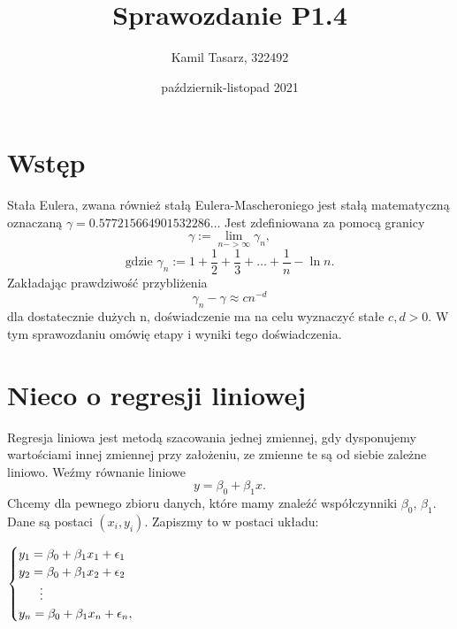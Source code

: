 \documentclass[a4paper,12pt]{article}
\title{Sprawozdanie P1.4}
\author{Kamil Tasarz, 322492}
\date{październik-listopad 2021}
\begin{document}
\maketitle


\section{Wstęp}

Stała Eulera, zwana również stałą Eulera-Mascheroniego jest stałą matematyczną oznaczaną $\gamma =  0.577215664901532286 \dots$ Jest zdefiniowana za pomocą granicy 
$$\gamma := \lim_{n-> \infty} \gamma_n,$$ $$\text{gdzie }\gamma_n := 1 + \frac{1}{2} + \frac{1}{3} + \dots + \frac{1}{n} - \ln{n}.$$
Zakładając prawdziwość przybliżenia $$\gamma_n - \gamma \approx cn^{-d}$$ dla dostatecznie dużych n, doświadczenie ma na celu wyznaczyć stałe $c, d >0$. W tym sprawozdaniu omówię etapy i wyniki tego doświadczenia.


\section{Nieco o regresji liniowej}

Regresja liniowa jest metodą szacowania jednej zmiennej, gdy dysponujemy wartościami innej zmiennej przy założeniu, ze zmienne te są od siebie zależne liniowo. Weźmy równanie liniowe
$$ y = \beta_0 + \beta_1x. $$
Chcemy dla pewnego zbioru danych, które mamy znaleźć współczynniki $\beta_0$, $\beta_1$. Dane są postaci $(x_i, y_i)$. Zapiszmy to w postaci układu:

$\begin{cases}
y_1 = \beta_0 +\beta_1x_1 + \epsilon_1 \\
y_2 = \beta_0 +\beta_1x_2 + \epsilon_2 \\ 
\hspace{6mm} \vdots \\
y_n = \beta_0 +\beta_1x_n + \epsilon_n,
\end{cases}$
\end{document}
